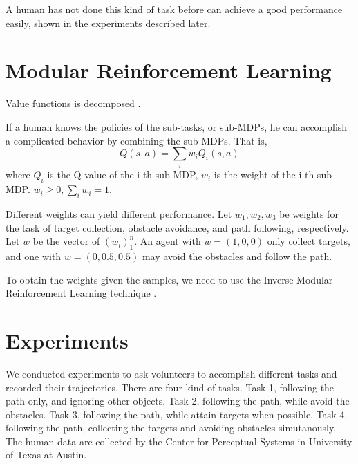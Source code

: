 \documentclass[11pt]{article} %
\begin{document}
A human has not done this kind of task before can achieve a good performance
easily, shown in the experiments described later.

\section{Modular Reinforcement Learning}

Value functions is decomposed \cite{koller1999computing}.

 If a human knows the policies
of the sub-tasks, or sub-MDPs, he can accomplish a complicated behavior by
combining the sub-MDPs. That is,
$$Q(s, a) = \sum_i w_i Q_i (s, a)$$
where $Q_i$ is the Q value of the i-th sub-MDP, $w_i$ is the weight of the i-th
sub-MDP. $w_i \geq 0, \sum_i w_i = 1$.

Different weights can yield different performance. Let $w_1, w_2, w_3$ be
weights for the task of target collection, obstacle avoidance, and path
following, respectively. Let $w$ be the vector of $(w_i)_1^n$. An agent with $w
= (1, 0, 0)$ only collect targets, and one with $w = (0, 0.5, 0.5)$ may avoid
the obstacles and follow the path.

To obtain the weights given the samples, we need to use the Inverse Modular
Reinforcement Learning technique \cite{rothkopf2013modular}.

\section{Experiments}

We conducted experiments to ask volunteers to accomplish different tasks and
recorded their trajectories. There are four kind of tasks. Task 1, following the
path only, and ignoring other objects. Task 2, following the path, while avoid
the obstacles. Task 3, following the path, while attain targets when possible.
Task 4, following the path, collecting the targets and avoiding obstacles
simutanously.
The human data are collected by the Center for Perceptual Systems in University
of Texas at Austin.
\end{document}
